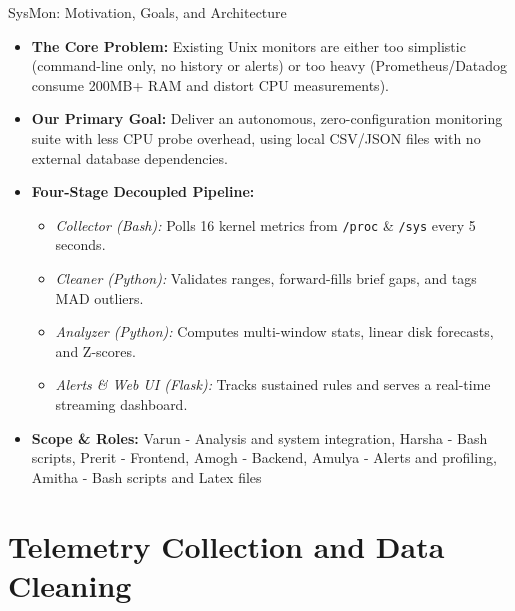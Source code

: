 \documentclass[aspectratio=169,10pt]{beamer}
\begin{document}
\begin{frame}{SysMon: Motivation, Goals, and Architecture}
    \begin{itemize}
        \setlength{\itemsep}{10pt}
        \item \textbf{The Core Problem:} Existing Unix monitors are either too simplistic (command-line only, no history or alerts) or too heavy (Prometheus/Datadog consume 200MB+ RAM and distort CPU measurements).
        \item \textbf{Our Primary Goal:} Deliver an autonomous, zero-configuration monitoring suite with less CPU probe overhead, using local CSV/JSON files with no external database dependencies.
        \item \textbf{Four-Stage Decoupled Pipeline:}
        \begin{itemize}
            \setlength{\itemsep}{3pt}
            \item \textit{Collector (Bash):} Polls 16 kernel metrics from \texttt{/proc} \& \texttt{/sys} every 5 seconds.
            \item \textit{Cleaner (Python):} Validates ranges, forward-fills brief gaps, and tags MAD outliers.
            \item \textit{Analyzer (Python):} Computes multi-window stats, linear disk forecasts, and Z-scores.
            \item \textit{Alerts \& Web UI (Flask):} Tracks sustained rules and serves a real-time streaming dashboard.
        \end{itemize}
        \item \textbf{Scope \& Roles:} Varun - Analysis and system integration,
        Harsha - Bash scripts,
        Prerit - Frontend,
        Amogh - Backend,
        Amulya - Alerts and profiling,
        Amitha - Bash scripts and Latex files
    \end{itemize}
\end{frame}

\section{Telemetry Collection and Data Cleaning}

\end{document}
